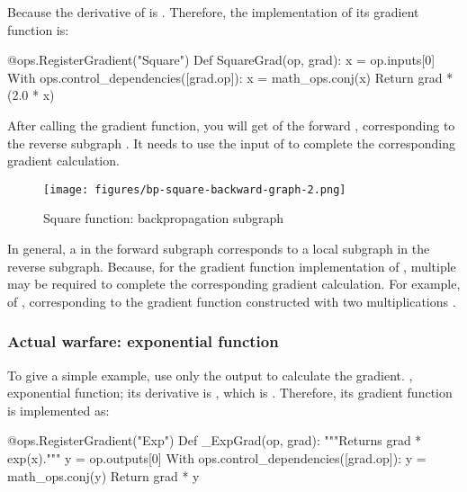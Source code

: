 \begin{content}
Because the derivative of  is . Therefore, the implementation of its gradient function  is:

\begin{leftbar}
\begin{python}
@ops.RegisterGradient("Square")
Def SquareGrad(op, grad):
  x = op.inputs[0]
  With ops.control_dependencies([grad.op]):
    x = math_ops.conj(x)
    Return grad * (2.0 * x)
\end{python}
\end{leftbar}

After calling the gradient function, you will get  of the forward , corresponding to the reverse subgraph . It needs to use the input of  to complete the corresponding gradient calculation.

\begin{figure}[!h]
  \centering
  \texttt{[image: figures/bp-square-backward-graph-2.png]}
  \caption{Square function: backpropagation subgraph}
  \label{fig:bp-square-backward-graph-2}
\end{figure}

In general, a  in the forward subgraph corresponds to a local subgraph in the reverse subgraph. Because, for the gradient function implementation of , multiple  may be required to complete the corresponding gradient calculation. For example,  of , corresponding to the gradient function constructed with two  multiplications .


\subsubsection{Actual warfare: exponential function}
To give a simple example, use only the output to calculate the gradient. , exponential function; its derivative is , which is . Therefore, its gradient function is implemented as:

\begin{leftbar}
\begin{python}
@ops.RegisterGradient("Exp")
Def _ExpGrad(op, grad):
  """Returns grad * exp(x)."""
  y = op.outputs[0]
  With ops.control_dependencies([grad.op]):
    y = math_ops.conj(y)
    Return grad * y
\end{python}
\end{leftbar}


\end{content}
